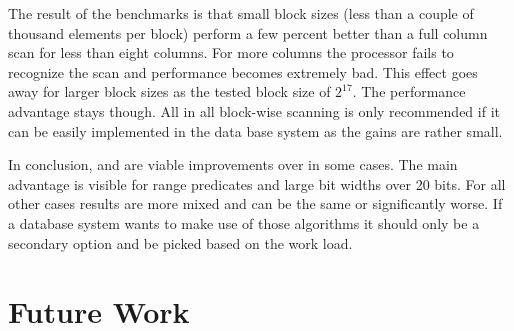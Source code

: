 The result of the benchmarks is that small block sizes (less than a couple of
thousand elements per block) perform a few percent better than a full column
scan for less than eight columns. For more columns the processor fails to
recognize the scan and performance becomes extremely bad. This effect goes away
for larger block sizes as the tested block size of $2^{17}$. The performance
advantage stays though. All in all block-wise scanning is only recommended if
it can be easily implemented in the data base system as the gains are rather
small.

In conclusion, \bwv{} and \bs{} are viable improvements over \simdscan{} in
some cases. The main advantage is visible for range predicates and large bit
widths over 20 bits. For all other cases results are more mixed and can be the
same or significantly worse. If a database system wants to make use of those
algorithms it should only be a secondary option and be picked based on the work
load.

\section{Future Work}
